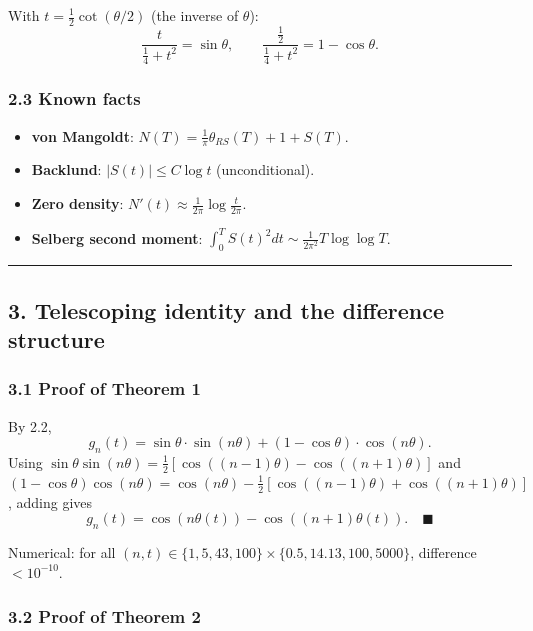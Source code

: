 \documentclass[
]{article}
\providecommand{\tightlist}{%
  \setlength{\itemsep}{0pt}\setlength{\parskip}{0pt}}
\begin{document}
With \(t = \tfrac12\cot(\theta/2)\) (the inverse of \(\theta\)):
\[\frac{t}{\tfrac14+t^2} = \sin\theta, \qquad \frac{\tfrac12}{\tfrac14+t^2} = 1-\cos\theta.\]

\hypertarget{known-facts}{%
\subsubsection{2.3 Known facts}\label{known-facts}}

\begin{itemize}
\tightlist
\item
  \textbf{von Mangoldt}: \(N(T) = \tfrac1\pi\theta_{RS}(T) + 1 + S(T)\).
\item
  \textbf{Backlund}: \(|S(t)| \le C\log t\) (unconditional).
\item
  \textbf{Zero density}:
  \(N'(t) \approx \tfrac{1}{2\pi}\log\tfrac{t}{2\pi}\).
\item
  \textbf{Selberg second moment}:
  \(\int_0^T S(t)^2dt \sim \tfrac{1}{2\pi^2}T\log\log T\).
\end{itemize}

\begin{center}\rule{0.5\linewidth}{0.5pt}\end{center}

\hypertarget{telescoping-identity-and-the-difference-structure}{%
\subsection{3. Telescoping identity and the difference
structure}\label{telescoping-identity-and-the-difference-structure}}

\hypertarget{proof-of-theorem-1}{%
\subsubsection{3.1 Proof of Theorem 1}\label{proof-of-theorem-1}}

By 2.2,
\[g_n(t) = \sin\theta\cdot\sin(n\theta) + (1-\cos\theta)\cdot\cos(n\theta).\]
Using
\(\sin\theta\sin(n\theta) = \tfrac12[\cos((n-1)\theta) - \cos((n+1)\theta)]\)
and
\((1-\cos\theta)\cos(n\theta) = \cos(n\theta) - \tfrac12[\cos((n-1)\theta)+\cos((n+1)\theta)]\),
adding gives
\[g_n(t) = \cos(n\theta(t)) - \cos((n+1)\theta(t)). \quad \blacksquare\]

Numerical: for all
\((n,t) \in \{1,5,43,100\}\times\{0.5, 14.13, 100, 5000\}\), difference
\(< 10^{-10}\).

\hypertarget{proof-of-theorem-2}{%
\subsubsection{3.2 Proof of Theorem 2}\label{proof-of-theorem-2}}
\end{document}
